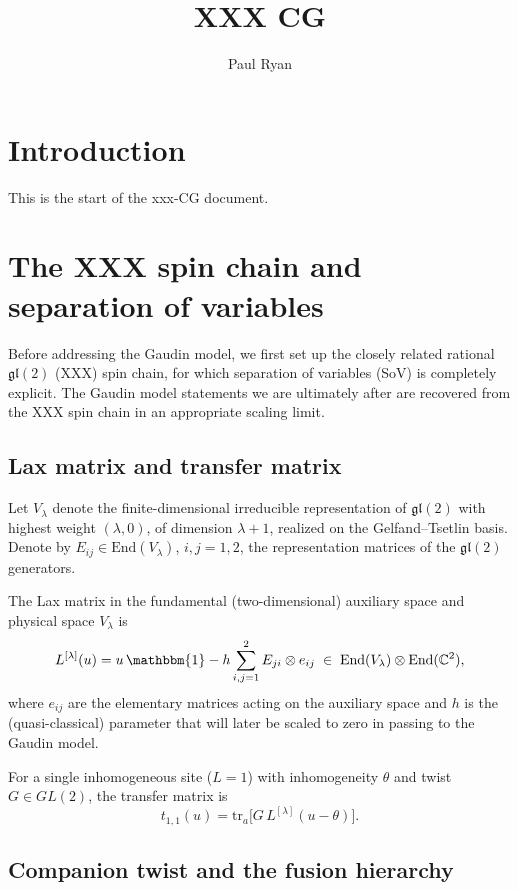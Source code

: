 \documentclass[12pt]{article}
\title{XXX CG}
\author{Paul Ryan}
\newcommand{\Ident}{\mathbbm{1}}
\begin{document}
\maketitle

\section{Introduction}

This is the start of the xxx-CG document.

\section{The XXX spin chain and separation of variables}
\label{sec:xxx-sov}

Before addressing the Gaudin model, we first set up the closely related rational $\mathfrak{gl}(2)$ (XXX) spin chain, for which separation of variables (SoV) is completely explicit. The Gaudin model statements we are ultimately after are recovered from the XXX spin chain in an appropriate scaling limit.

\subsection{Lax matrix and transfer matrix}

Let $V_\lambda$ denote the finite-dimensional irreducible representation of $\mathfrak{gl}(2)$ with highest weight $(\lambda,0)$, of dimension $\lambda+1$, realized on the Gelfand--Tsetlin basis. Denote by $E_{ij}\in\mathrm{End}(V_\lambda)$, $i,j=1,2$, the representation matrices of the $\mathfrak{gl}(2)$ generators.

The Lax matrix in the fundamental (two-dimensional) auxiliary space and physical space $V_\lambda$ is
\[
L^{[\lambda]}(u) = u\,\Ident - h\sum_{i,j=1}^2 E_{ji}\otimes e_{ij} \;\in\; \mathrm{End}(V_\lambda)\otimes\mathrm{End}(\mathbb{C}^2),
\]
where $e_{ij}$ are the elementary matrices acting on the auxiliary space and $h$ is the (quasi-classical) parameter that will later be scaled to zero in passing to the Gaudin model.

For a single inhomogeneous site ($L=1$) with inhomogeneity $\theta$ and twist $G\in GL(2)$, the transfer matrix is
\[
t_{1,1}(u) = \mathrm{tr}_a\big[G\,L^{[\lambda]}(u-\theta)\big] .
\]

\subsection{Companion twist and the fusion hierarchy}
\end{document}
